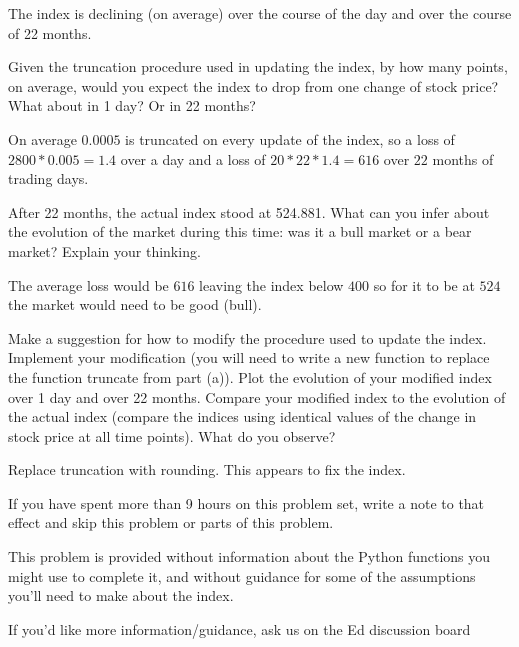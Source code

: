 \documentclass[12pt,letterpaper,answers]{exam}
\begin{document}
\begin{questions}
\begin{parts}
\begin{solution}
  The index is declining (on average) over the course of the day and over the course of 22 months.
 
 \end{solution}

\item Given the truncation procedure used in updating the index, by how many points, on average, would you expect the index to drop from one change of stock price?  What about in 1 day? Or in 22 months?

\begin{solution}
On average $0.0005$ is truncated on every update of the index, so a loss of $2800*0.005 = 1.4$ over a day and a loss of $20*22*1.4 = 616$ over $22$ months of trading days.
\end{solution}

\item After 22 months, the actual index stood at 524.881. What can you infer about the evolution of the market during this time: was it a bull market or a bear market? Explain your thinking.

\begin{solution}
The average loss would be $616$ leaving the index below $400$ so for it to be at $524$ the market would need to be good (bull).
\end{solution}

\item Make a suggestion for how to modify the procedure used to update the index. Implement your modification (you will need to write a new function to replace the function truncate from part (a)). Plot the evolution of your modified index over 1 day and over 22 months.  Compare your modified index to the evolution of the actual index (compare the indices using identical values of the change in stock price at all time points). What do you observe?

\begin{solution}
Replace truncation with rounding.  This appears to fix the index.
\end{solution}

\item If you have spent more than 9 hours on this problem set, write a note to that effect and skip this problem or parts of this problem.  

\end{parts}


This problem is provided without information about the Python functions you might use to complete it, and without guidance for some of the assumptions you'll need to make about the index.  

If you'd like more information/guidance, ask us on the Ed discussion board


\end{questions}





\end{document}
